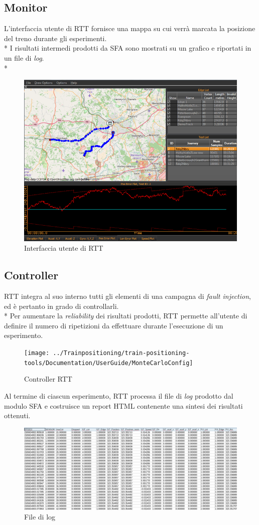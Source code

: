 \subsection{Monitor}
L'interfaccia utente di RTT fornisce una mappa su cui verr\`a marcata la posizione del treno durante gli esperimenti.\\*
I risultati intermedi prodotti da SFA sono mostrati su un grafico e riportati in un file di \emph{log}.\\*
\begin{figure}[h]
	\centering
	\includegraphics[width=0.7\linewidth]{img/rtthci2}
	\caption{Interfaccia utente di RTT}
	\label{fig:rtthci2}
\end{figure}
\subsection{Controller}
RTT integra al suo interno tutti gli elementi di una campagna di \emph{fault injection}, ed \`e pertanto in grado di controllarli.\\*
Per aumentare la \emph{reliability} dei risultati prodotti, RTT permette all'utente di definire il numero di ripetizioni da effettuare durante l'esecuzione di un esperimento.
\begin{figure}[h]
	\centering
	\texttt{[image: ../Trainpositioning/train-positioning-tools/Documentation/UserGuide/MonteCarloConfig]}
	\caption{Controller RTT}
	\label{fig:montecarloconfig}
\end{figure}
Al termine di ciascun esperimento, RTT processa il file di \emph{log} prodotto dal modulo SFA e costruisce un report HTML contenente una sintesi dei risultati ottenuti.
\begin{figure}
	\centering
	\includegraphics[width=\linewidth]{img/fusionlog}
	\caption{File di log}
	\label{fig:fusionlog}
\end{figure}
